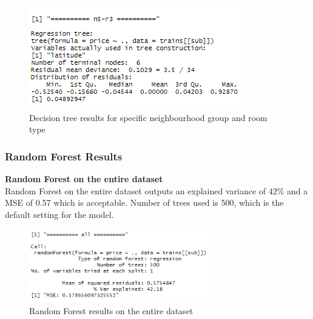 \documentclass{FR16}
\begin{document}
\begin{figure}[!htb]
   
    \begin{minipage}{0.48\textwidth}
     \centering
     \includegraphics[width=.7\linewidth]{figures/dt4.2.PNG}
   \end{minipage}
        \caption{ Decision tree results for specific neighbourhood group and room type}\label{fig:12}

\end{figure}

\newpage
\subsubsection{Random Forest Results}
\textbf{Random Forest  on the entire dataset}\\
Random Forest on the entire dataset outputs an explained variance of $42\%$ and a MSE of 0.57 which is acceptable. Number of trees used is 500, which is the default setting for the model.
\begin{figure}[h]
\centering
\includegraphics[width=0.7\textwidth]{figures/rf.PNG} 
 \caption{\label{fig:13} Random Forest results on the entire dataset}
\end{figure}
\end{document}
